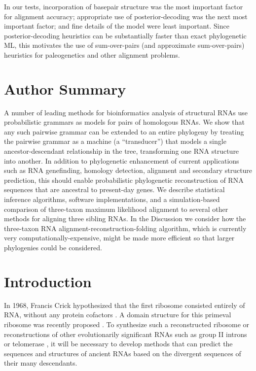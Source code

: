 \documentclass[10pt]{article}
\begin{document}
In our tests, incorporation of basepair structure was the most important factor for alignment accuracy;
appropriate use of posterior-decoding was the next most important factor;
and fine details of the model were least important.
Since posterior-decoding heuristics can be substantially faster than exact phylogenetic ML,
this motivates the use of sum-over-pairs (and approximate sum-over-pairs) heuristics
for paleogenetics and other alignment problems.


\newpage
\section*{Author Summary}

A number of leading methods for bioinformatics analysis of structural
RNAs use probabilistic grammars as models for pairs of homologous
RNAs.  We show that any such pairwise grammar can be extended to an
entire phylogeny by treating the pairwise grammar as a machine (a
``transducer'') that models a single ancestor-descendant relationship
in the tree, transforming one RNA structure into another.  In addition
to phylogenetic enhancement of current applications such as RNA genefinding, homology detection,
alignment and secondary structure prediction, this should enable
probabilistic phylogenetic reconstruction of RNA sequences that are ancestral to
present-day genes.  We describe statistical inference algorithms, software
implementations, and a simulation-based comparison
of three-taxon maximum likelihood alignment to several other methods
for aligning three sibling RNAs.
In the Discussion we consider how the three-taxon RNA
alignment-reconstruction-folding algorithm, which is currently very
computationally-expensive, might be made more efficient so that larger
phylogenies could be considered.

\newpage
\section*{Introduction}
In 1968, Francis Crick hypothesized that the first ribosome consisted entirely of RNA, without any protein cofactors \cite{Crick68}.
A domain structure for this primeval ribosome was recently proposed \cite{SmithEtAl2008}.
To synthesize such a reconstructed ribosome or reconstructions of other evolutionarily significant RNAs
such as group II introns \cite{LehmannSchmidt2003} or telomerase \cite{AntalEtAl2002},
it will be necessary to develop methods that can predict the sequences
and structures of ancient RNAs
based on the divergent sequences of their many descendants.
\end{document}
